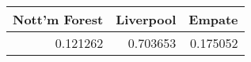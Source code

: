 \begin{tabular}{rrr}
\hline
   Nott'm Forest &   Liverpool &   Empate \\
\hline
        0.121262 &    0.703653 & 0.175052 \\
\hline
\end{tabular}